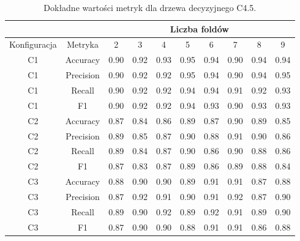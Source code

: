 \begin{table}[H]
  \center
\begin{tabular}{|c|c|c|c|c|c|c|c|c|c|}  \hline
  \multicolumn{2}{|c|}{} & \multicolumn{8}{c|}{Liczba foldów} \\ \hline
Konfiguracja &    Metryka &     2 &     3 &     4 &     5 &     6 &     7 &     8 &     9 \\ \hline
          C1 &   Accuracy &  0.90 &  0.92 &  0.93 &  0.95 &  0.94 &  0.90 &  0.94 &  0.94 \\ \hline
          C1 &  Precision &  0.90 &  0.92 &  0.92 &  0.95 &  0.94 &  0.90 &  0.94 &  0.95 \\ \hline
          C1 &     Recall &  0.90 &  0.92 &  0.92 &  0.94 &  0.94 &  0.91 &  0.92 &  0.93 \\ \hline
          C1 &         F1 &  0.90 &  0.92 &  0.92 &  0.94 &  0.93 &  0.90 &  0.93 &  0.93 \\ \hline \hline
          C2 &   Accuracy &  0.87 &  0.84 &  0.86 &  0.89 &  0.87 &  0.90 &  0.89 &  0.85 \\ \hline
          C2 &  Precision &  0.89 &  0.85 &  0.87 &  0.90 &  0.88 &  0.91 &  0.90 &  0.86 \\ \hline
          C2 &     Recall &  0.89 &  0.84 &  0.87 &  0.90 &  0.86 &  0.90 &  0.88 &  0.86 \\ \hline
          C2 &         F1 &  0.87 &  0.83 &  0.87 &  0.89 &  0.86 &  0.89 &  0.88 &  0.84 \\ \hline \hline
          C3 &   Accuracy &  0.88 &  0.90 &  0.90 &  0.89 &  0.91 &  0.91 &  0.87 &  0.88 \\ \hline
          C3 &  Precision &  0.87 &  0.92 &  0.91 &  0.90 &  0.91 &  0.92 &  0.87 &  0.90 \\ \hline
          C3 &     Recall &  0.89 &  0.90 &  0.92 &  0.89 &  0.92 &  0.91 &  0.89 &  0.90 \\ \hline
          C3 &         F1 &  0.87 &  0.90 &  0.90 &  0.88 &  0.91 &  0.91 &  0.86 &  0.88 \\ \hline
\end{tabular}


  \caption{Dokładne wartości metryk dla drzewa decyzyjnego C4.5.}
\end{table}
